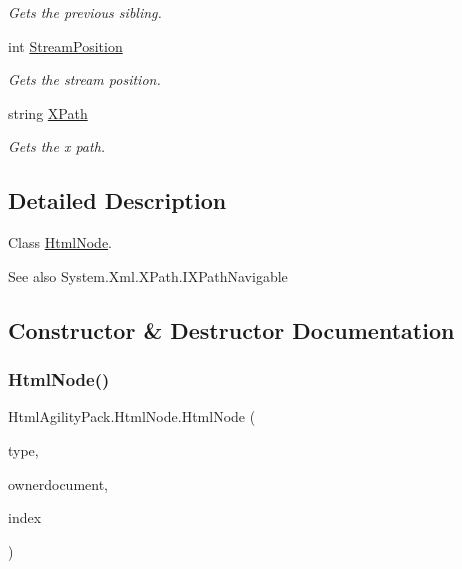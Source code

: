 \begin{DoxyCompactItemize}
\begin{DoxyCompactList}\small\item\em Gets the previous sibling. \end{DoxyCompactList}\item 
int \hyperlink{class_html_agility_pack_1_1_html_node_aa6ae06ace7dbc9d61f94c6a501810ac0}{Stream\+Position}
\begin{DoxyCompactList}\small\item\em Gets the stream position. \end{DoxyCompactList}\item 
string \hyperlink{class_html_agility_pack_1_1_html_node_a689dc36bee07f9c1f265e45daa19c13c}{X\+Path}
\begin{DoxyCompactList}\small\item\em Gets the x path. \end{DoxyCompactList}\end{DoxyCompactItemize}


\subsection{Detailed Description}
Class \hyperlink{class_html_agility_pack_1_1_html_node}{Html\+Node}. 

\begin{DoxySeeAlso}{See also}
System.\+Xml.\+X\+Path.\+I\+X\+Path\+Navigable


\end{DoxySeeAlso}


\subsection{Constructor \& Destructor Documentation}
\mbox{\label{class_html_agility_pack_1_1_html_node_a45c77e9a164bfe301f5aa587baa790e0}} 
\subsubsection{\texorpdfstring{Html\+Node()}{HtmlNode()}}
{\footnotesize\ttfamily Html\+Agility\+Pack.\+Html\+Node.\+Html\+Node (\begin{DoxyParamCaption}\item[{\hyperlink{namespace_html_agility_pack_a0f81457339b5330e8cf9abe5a6123171}{Html\+Node\+Type}}]{type,  }\item[{\hyperlink{class_html_agility_pack_1_1_html_document}{Html\+Document}}]{ownerdocument,  }\item[{int}]{index }\end{DoxyParamCaption})\hspace{0.3cm}{\ttfamily [inline]}}



